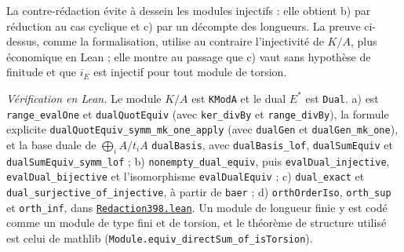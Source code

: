 \noindent La contre-rédaction évite à dessein les modules injectifs : elle obtient b) par réduction au cas cyclique et c) par un décompte des longueurs. La preuve ci-dessus, comme la formalisation, utilise au contraire l'injectivité de $K/A$, plus économique en Lean ; elle montre au passage que c) vaut sans hypothèse de finitude et que $i_E$ est injectif pour tout module de torsion.

\begin{sloppypar}
\noindent\emph{Vérification en Lean.} Le module $K/A$ est \texttt{KModA} et le dual $E^{*}$ est \texttt{Dual}. a) est \texttt{range\_evalOne} et \texttt{dualQuotEquiv} (avec \texttt{ker\_divBy} et \texttt{range\_divBy}), la formule explicite \texttt{dualQuotEquiv\_symm\_mk\_one\_apply} (avec \texttt{dualGen} et \texttt{dualGen\_mk\_one}), et la base duale de $\bigoplus_i A/t_iA$ \texttt{dualBasis}, avec \texttt{dualBasis\_lof}, \texttt{dualSumEquiv} et \texttt{dualSumEquiv\_symm\_lof} ; b) \texttt{nonempty\_dual\_equiv}, puis \texttt{evalDual\_injective}, \texttt{evalDual\_bijective} et l'isomorphisme \texttt{evalDualEquiv} ; c) \texttt{dual\_exact} et \texttt{dual\_surjective\_of\_injective}, à partir de \texttt{baer} ; d) \texttt{orthOrderIso}, \texttt{orth\_sup} et \texttt{orth\_inf}, dans \href{\leanblobmain/Redaction398.lean}{\texttt{Redaction398.\allowbreak{}lean}}. Un module de longueur finie y est codé comme un module de type fini et de torsion, et le théorème de structure utilisé est celui de mathlib (\texttt{Module.equiv\_directSum\_of\_isTorsion}).
\end{sloppypar}

